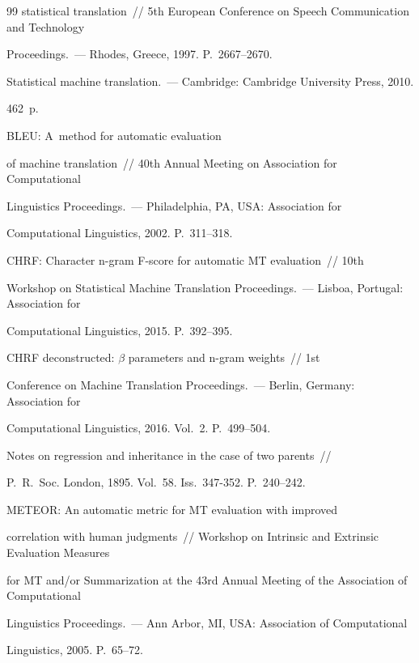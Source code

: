{{\begin{thebibliography}{99}
statistical translation~/\!\!/ 5th European Conference on Speech Communication and Technology 

Proceedings.~--- Rhodes, Greece, 1997. P.~2667--2670.


 Statistical machine translation.~--- Cambridge: Cambridge University Press, 2010. 

462~p. 


 BLEU: A~method for automatic evaluation 

of machine translation~/\!\!/ 40th Annual Meeting on Association for Computational 

Linguistics Proceedings.~--- Philadelphia, PA, USA: Association for 

Computational Linguistics, 2002. P.~311--318.


 CHRF: Character n-gram F-score for automatic MT evaluation~/\!\!/ 10th 

Workshop on Statistical Machine Translation Proceedings.~--- Lisboa, Portugal: Association for 

Computational Linguistics, 2015. P.~392--395.


 CHRF deconstructed: $\beta$ parameters and n-gram weights~/\!\!/ 1st 

Conference on Machine Translation Proceedings.~--- Berlin, Germany: Association for 

Computational Linguistics, 2016. Vol.~2. P.~499--504.


 Notes on regression and inheritance in the case of two parents~/\!\!/ 

P.~R.~Soc. London, 1895. Vol.~58. Iss.~347-352. P.~240--242.


 METEOR: An automatic metric for MT evaluation with improved 

correlation with human judgments~/\!\!/ Workshop on Intrinsic and Extrinsic Evaluation Measures 

for MT and/or Summarization at the 43rd Annual Meeting of the Association of Computational 

Linguistics Proceedings.~--- Ann Arbor, MI, USA: Association of Computational 

Linguistics, 2005. P.~65--72.

        \end{thebibliography}

} }





